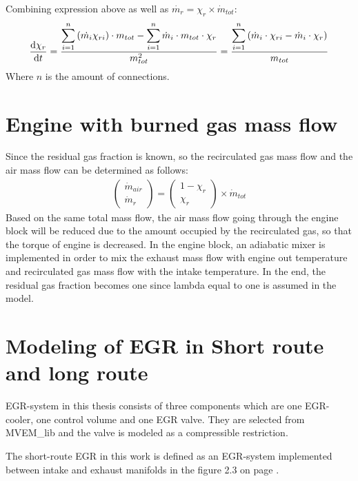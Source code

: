 Combining expression above as well as $\dot{m_r}=\chi_r \times 
\dot{m}_{tot}$:
\begin{align}
\frac{\mathrm d \chi_r}{\mathrm d t} ={{\displaystyle\sum_{i=1}^{n} {{(\dot{m_i}\chi_{ri})} \cdot m_{tot}}-\displaystyle\sum_{i=1}^{n} {\dot{m}_i} \cdot m_{tot} \cdot \chi_r}\over m_{tot}^2 }= {{\displaystyle\sum_{i=1}^{n}{(\dot{m}_i \cdot \chi_{ri}-\dot{m}_i \cdot \chi_r)}} \over m_{tot}}
\end{align}
Where $n$ is the amount of connections.

\section{Engine with burned gas mass flow}
Since the residual gas fraction is known, so the recirculated gas mass flow and the air mass flow can be determined as follows:
\begin{align}
\left(\!
    \begin{array}{c}
     \dot{m}_{air} \\
      \dot{m}_r
    \end{array}
  \!\right) =\left(\!
    \begin{array}{c}
     1-\chi_r \\
      \chi_r
    \end{array}
  \!\right)\times \dot{m}_{tot}
\end{align}
Based on the same total mass flow, the air mass flow going through the engine block will be reduced due to the amount occupied by the recirculated gas, so that the torque of engine is decreased.  In the engine block, an adiabatic mixer is implemented in order to mix the exhaust mass flow with engine out temperature and recirculated gas mass flow with the intake temperature. In the end, the residual gas fraction becomes one since lambda equal to one is assumed in the model.

\section{Modeling of EGR in Short route and long route}
EGR-system in this thesis consists of three components which are one EGR-cooler, one control volume and one EGR valve. They are selected from MVEM\_lib and the valve is modeled as a compressible restriction.

The short-route EGR in this work is defined as an EGR-system implemented between intake and exhaust manifolds in the figure 2.3 on page \pageref{fig:short_route_model}. 

